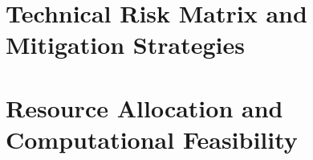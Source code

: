 \section{Technical Risk Matrix and Mitigation Strategies}
\label{sec:impl_risks}

\section{Resource Allocation and Computational Feasibility}
\label{sec:impl_resources}
